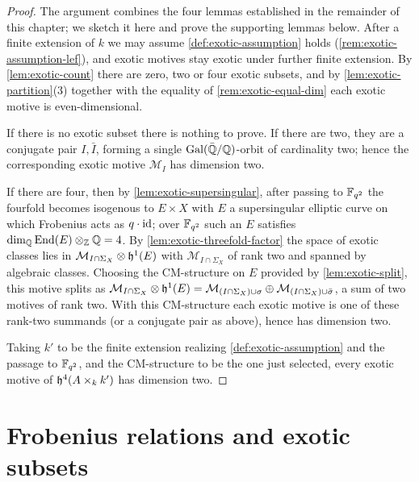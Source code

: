 \begin{proof}
  The argument combines the four lemmas established in the remainder of this
  chapter; we sketch it here and prove the supporting lemmas below.
  After a finite extension of \(k\) we may assume \cref{def:exotic-assumption}
  holds (\cref{rem:exotic-assumption-lef}), and exotic motives stay exotic under
  further finite extension. By \cref{lem:exotic-count} there are zero, two or
  four exotic subsets, and by \cref{lem:exotic-partition}(3) together with the
  equality of \cref{rem:exotic-equal-dim} each exotic motive is even-dimensional.

  If there is no exotic subset there is nothing to prove. If there are two, they
  are a conjugate pair \(I, \bar I\), forming a single \(\mathrm{Gal}(\bar{\mathbb{Q}}/\mathbb{Q})\)-orbit
  of cardinality two; hence the corresponding exotic motive \(\mathcal{M}_I\) has
  dimension two.

  If there are four, then by \cref{lem:exotic-supersingular}, after passing to
  \(\mathbb{F}_{q^2}\) the fourfold becomes isogenous to \(E \times X\) with \(E\) a
  supersingular elliptic curve on which Frobenius acts as \(q \cdot \mathrm{id}\); over
  \(\mathbb{F}_{q^2}\) such an \(E\) satisfies \(\dim_{\mathbb{Q}} \mathrm{End}(E) \otimes_{\mathbb{Z}} \mathbb{Q} = 4\). By
  \cref{lem:exotic-threefold-factor} the space of exotic classes lies in
  \(\mathcal{M}_{I \cap \Sigma_X} \otimes \mathfrak{h}^1(E)\) with
  \(\mathcal{M}_{I \cap \Sigma_X}\) of rank two and spanned by algebraic classes.
  Choosing the CM-structure on \(E\) provided by \cref{lem:exotic-split}, this
  motive splits as
  \(\mathcal{M}_{I \cap \Sigma_X} \otimes \mathfrak{h}^1(E) =
    \mathcal{M}_{(I \cap \Sigma_X) \cup \sigma} \oplus
    \mathcal{M}_{(I \cap \Sigma_X) \cup \bar\sigma}\),
  a sum of two motives of rank two. With this CM-structure each exotic motive is
  one of these rank-two summands (or a conjugate pair as above), hence has
  dimension two.

  Taking \(k'\) to be the finite extension realizing \cref{def:exotic-assumption}
  and the passage to \(\mathbb{F}_{q^2}\), and the CM-structure to be the one just
  selected, every exotic motive of \(\mathfrak{h}^{4}(A \times_k k')\) has dimension two.
\end{proof}

\section*{Frobenius relations and exotic subsets}


